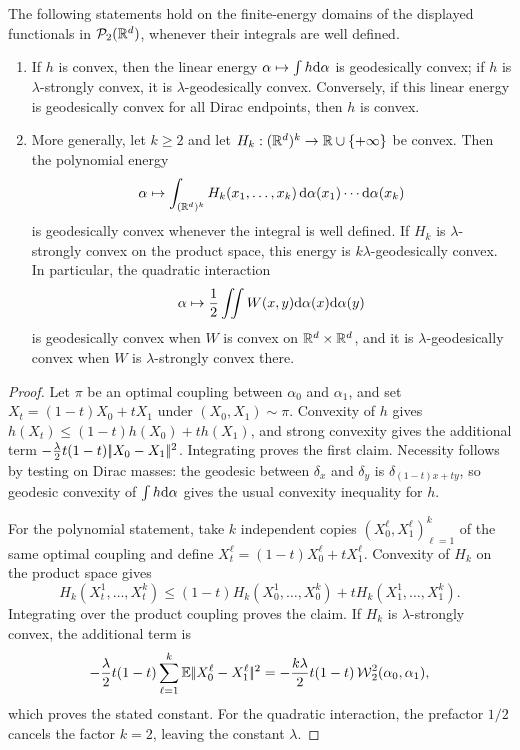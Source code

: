 \begin{prop}\label{prop-basic-geodesic-convexity}
	The following statements hold on the finite-energy domains of the displayed functionals in $\mathcal{P}_2(\mathbb{R}^d)$, whenever their integrals are well defined.
	\begin{enumerate}
		\item If $h$ is convex, then the linear energy $\alpha\mapsto\int h\mathrm{d}\alpha$ is geodesically convex; if $h$ is $\lambda$-strongly convex, it is $\lambda$-geodesically convex. Conversely, if this linear energy is geodesically convex for all Dirac endpoints, then $h$ is convex.
		\item More generally, let \(k\geq2\) and let \(H_k:(\mathbb{R}^d)^k\to\mathbb{R}\cup\{+\infty\}\) be convex. Then the polynomial energy
		\[
			\alpha\mapsto \int_{(\mathbb{R}^d)^k} H_k(x_1,\ldots,x_k)\,\mathrm{d}\alpha(x_1)\cdots\mathrm{d}\alpha(x_k)
		\]
		is geodesically convex whenever the integral is well defined. If $H_k$ is $\lambda$-strongly convex on the product space, this energy is $k\lambda$-geodesically convex. In particular, the quadratic interaction
		\[
			\alpha\mapsto\frac12\iint W(x,y)\mathrm{d}\alpha(x)\mathrm{d}\alpha(y)
		\]
		is geodesically convex when \(W\) is convex on \(\mathbb{R}^d\times\mathbb{R}^d\), and it is $\lambda$-geodesically convex when $W$ is $\lambda$-strongly convex there.
	\end{enumerate}
\end{prop}
\begin{proof}
	Let \(\pi\) be an optimal coupling between \(\alpha_0\) and \(\alpha_1\), and set \(X_t=(1-t)X_0+tX_1\) under \((X_0,X_1)\sim\pi\). Convexity of \(h\) gives \(h(X_t)\leq(1-t)h(X_0)+t h(X_1)\), and strong convexity gives the additional term \(-\frac{\lambda}{2}t(1-t)|\!| X_0-X_1 |\!|^2\). Integrating proves the first claim. Necessity follows by testing on Dirac masses: the geodesic between \(\delta_x\) and \(\delta_y\) is \(\delta_{(1-t)x+ty}\), so geodesic convexity of \(\int h\mathrm{d}\alpha\) gives the usual convexity inequality for \(h\).

	For the polynomial statement, take \(k\) independent copies \((X_0^\ell,X_1^\ell)_{\ell=1}^k\) of the same optimal coupling and define \(X_t^\ell=(1-t)X_0^\ell+tX_1^\ell\). Convexity of \(H_k\) on the product space gives
	\[
		H_k(X_t^1,\ldots,X_t^k)
		\leq (1-t)H_k(X_0^1,\ldots,X_0^k)+tH_k(X_1^1,\ldots,X_1^k).
	\]
	Integrating over the product coupling proves the claim. If $H_k$ is $\lambda$-strongly convex, the additional term is
	\[
		-\frac{\lambda}{2}t(1-t)
		\sum_{\ell=1}^k\mathbb{E}|\!| X_0^\ell-X_1^\ell |\!|^2
		=
		-\frac{k\lambda}{2}t(1-t)\operatorname{\mathcal{W}}_2^2(\alpha_0,\alpha_1),
	\]
	which proves the stated constant. For the quadratic interaction, the prefactor $1/2$ cancels the factor $k=2$, leaving the constant $\lambda$.
\end{proof}

